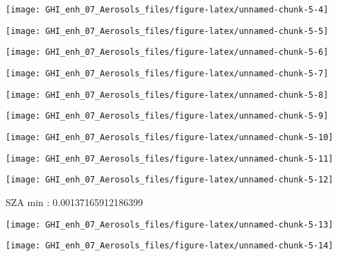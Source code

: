 \documentclass[
  10pt,
  a4paper,oneside]{article}
\begin{document}
\begin{center}\texttt{[image: GHI\_enh\_07\_Aerosols\_files/figure-latex/unnamed-chunk-5-4]} \end{center}

\begin{center}\texttt{[image: GHI\_enh\_07\_Aerosols\_files/figure-latex/unnamed-chunk-5-5]} \end{center}

\begin{center}\texttt{[image: GHI\_enh\_07\_Aerosols\_files/figure-latex/unnamed-chunk-5-6]} \end{center}

\begin{center}\texttt{[image: GHI\_enh\_07\_Aerosols\_files/figure-latex/unnamed-chunk-5-7]} \end{center}

\begin{center}\texttt{[image: GHI\_enh\_07\_Aerosols\_files/figure-latex/unnamed-chunk-5-8]} \end{center}

\begin{center}\texttt{[image: GHI\_enh\_07\_Aerosols\_files/figure-latex/unnamed-chunk-5-9]} \end{center}

\begin{center}\texttt{[image: GHI\_enh\_07\_Aerosols\_files/figure-latex/unnamed-chunk-5-10]} \end{center}

\begin{center}\texttt{[image: GHI\_enh\_07\_Aerosols\_files/figure-latex/unnamed-chunk-5-11]} \end{center}

\begin{center}\texttt{[image: GHI\_enh\_07\_Aerosols\_files/figure-latex/unnamed-chunk-5-12]} \end{center}

SZA min : 0.00137165912186399

\begin{center}\texttt{[image: GHI\_enh\_07\_Aerosols\_files/figure-latex/unnamed-chunk-5-13]} \end{center}

\begin{center}\texttt{[image: GHI\_enh\_07\_Aerosols\_files/figure-latex/unnamed-chunk-5-14]} \end{center}
\end{document}
